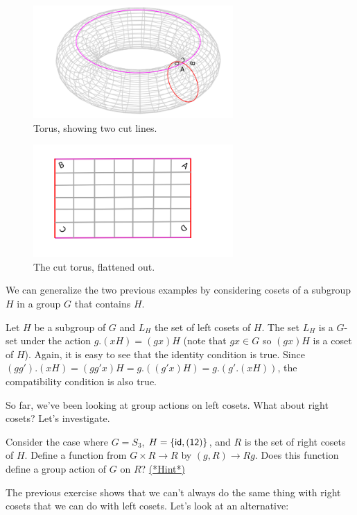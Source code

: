 \begin{figure}[ht]
\begin{center}
\includegraphics[width=3in]{images/Torus1.png}
\caption{Torus, showing two cut lines.}\label{fig:Torus1}
\end{center}
\end{figure}

\begin{figure}[ht]
\begin{center}
\includegraphics[width=3in]{images/Torus2.png}
\caption{The cut torus, flattened out.}\label{fig:Torus2}
\end{center}
\end{figure}

We can generalize the two previous examples by considering cosets of a subgroup $H$ in a group $G$ that contains $H$.

\begin{example}\label{example:actions:CosetAction}
Let $H$ be a subgroup of $G$ and $L_H$ the set of left cosets of $H$. The set $L_H$ is a $G$-set under the action 
$g.(xH)=(gx)H$ (note that $gx\in G$ so $(gx)H$ is a coset of $H$).
Again, it is easy to see that the identity condition is true. Since $(gg').(xH) =(gg'x)H=g.((g'x)H)= g.(g'.(xH))$, the compatibility condition is also true.
\end{example}
So far, we've been looking at group actions on left cosets.  What about right cosets?  Let's investigate.

\begin{exercise}\label{exercise:actions:RtCosetAction}
Consider the case where $G=S_3$, $H=\{\sf{id},(12)\}$, and $R$ is the set of right cosets of $H$.  Define a function from $G\times R\rightarrow R$ by $(g,R)\rightarrow Rg$. Does this function define a group action of $G$ on $R$? 
\hyperref[sec:actions:hints]{(*Hint*)}
\end{exercise}
The previous exercise shows that we can't always do the same thing with right cosets that we can do with left cosets.  Let's look at an alternative:  

